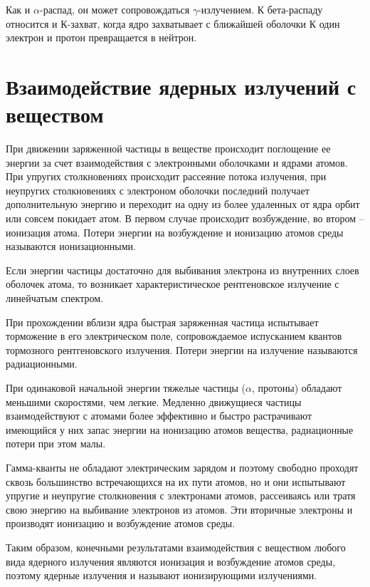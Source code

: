 \documentclass[14pt,pscyr,titlepage]{hedreport}
\begin{document}
		Как и \( \alpha \)-распад, он может сопровождаться 
		\( \gamma \)-излучением. К бета-распаду относится и \( К \)-захват, 
		когда ядро захватывает с ближайшей оболочки К один электрон и протон 
		превращается в нейтрон.

	\section{Взаимодействие ядерных излучений с веществом}
		При движении заряженной частицы в веществе происходит поглощение ее 
		энергии за счет взаимодействия с электронными оболочками и ядрами 
		атомов. При упругих столкновениях происходит рассеяние потока 
		излучения, при неупругих столкновениях с электроном оболочки последний 
		получает дополнительную энергию и переходит на одну из более удаленных 
		от ядра орбит или совсем покидает атом. В первом случае происходит 
		возбуждение, во втором -- ионизация атома. Потери энергии на 
		возбуждение и ионизацию атомов среды называются ионизационными.

		Если энергии частицы достаточно для выбивания электрона из внутренних 
		слоев оболочек атома, то возникает характеристическое рентгеновское 
		излучение с линейчатым спектром. 

		При прохождении вблизи ядра быстрая заряженная частица испытывает 
		торможение в его электрическом поле, сопровождаемое испусканием квантов 
		тормозного рентгеновского излучения. Потери энергии на излучение 
		называются радиационными. 

		При одинаковой начальной энергии тяжелые частицы (\( \alpha \), 
		протоны) обладают меньшими скоростями, чем легкие. Медленно движущиеся 
		частицы взаимодействуют с атомами более эффективно и быстро 
		растрачивают имеющийся у них запас энергии на ионизацию атомов 
		вещества, радиационные потери при этом малы.

		Гамма-кванты не обладают электрическим зарядом и поэтому свободно 
		проходят сквозь большинство встречающихся на их пути атомов, но и 
		они испытывают упругие и неупругие столкновения с электронами атомов, 
		рассеиваясь или тратя свою энергию на выбивание электронов из 
		атомов. Эти вторичные электроны и производят ионизацию и возбуждение 
		атомов среды.

        Таким образом, конечными результатами взаимодействия с веществом 
        любого вида ядерного излучения являются ионизация и возбуждение атомов 
        среды, поэтому ядерные излучения и называют ионизирующими излучениями.
\end{document}
